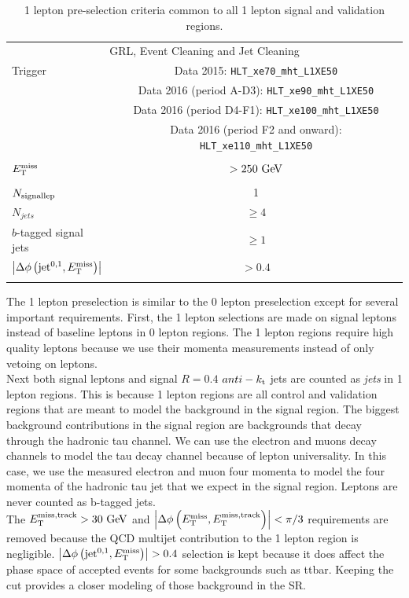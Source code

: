 \begin{table}[htbp]
  \caption{ 1 lepton pre-selection criteria common to all 1 lepton signal and validation regions.}
  \begin{center}
    \begin{tabular}{l|c} \hline\hline
      \multicolumn{2}{c}{GRL, Event Cleaning and Jet Cleaning} \\
      Trigger & Data 2015: \verb+HLT_xe70_mht_L1XE50+ \\ %
              & Data 2016 (period A-D3): \verb+HLT_xe90_mht_L1XE50+ \\  
              & Data 2016 (period D4-F1): \verb+HLT_xe100_mht_L1XE50+  \\ 
              & Data 2016 (period F2 and onward): \verb+HLT_xe110_mht_L1XE50+  \\ %
              & \\ [-2.5ex] \hline
      $E_{\mathrm{T}}^{\mathrm{miss}}$ & $> 250\GeV$ \\ %
              & \\ [-2.5ex] \hline
      $N_{\rm{signal lep}}$ & 1 \\ \hline
    $N_{jets}$ & $\ge 4$ \\ \hline
      $b$-tagged signal jets & $\ge1$ \\ \hline
      $\left|\Delta\phi\left(\mathrm{jet}^{0,1},E_{\mathrm{T}}^{\mathrm{miss}}\right)\right|$ & $> 0.4$ \\
              & \\ [-2.5ex] \hline
    \end{tabular}
  \end{center}
  \label{tab:1Lcommon}
\end{table}

\indent The 1 lepton preselection is similar to the 0 lepton preselection except for several important requirements. First, the 1 lepton selections are made on signal leptons instead of baseline leptons in 0 lepton regions.  The 1 lepton regions require high quality leptons because we use their momenta measurements instead of only vetoing on leptons.  \\

\indent Next both signal leptons and signal $R=0.4$ $anti-k_{\rm{t}}$ jets are counted as {\it jets} in 1 lepton regions.  This is because 1 lepton regions are all control and validation regions that are meant to model the background in the signal region.  The biggest background contributions in the signal region are backgrounds that decay through the hadronic tau channel.  We can use the electron and muons decay channels to model the tau decay channel because of lepton universality.  In this case, we use the measured electron and muon four momenta to model the four momenta of the hadronic tau jet that we expect in the signal region.  Leptons are never counted as b-tagged jets.  \\

\indent The $\mettrk > 30 \gev$ and $\dphimettrk < \pi/3$ requirements are removed because the QCD multijet contribution to the 1 lepton region is negligible.  $\left|\Delta\phi\left(\mathrm{jet}^{0,1},E_{\mathrm{T}}^{\mathrm{miss}}\right)\right| > 0.4$ selection is kept because it does affect the phase space of accepted events for some backgrounds such as ttbar.  Keeping the cut provides a closer modeling of those background in the SR. \\
